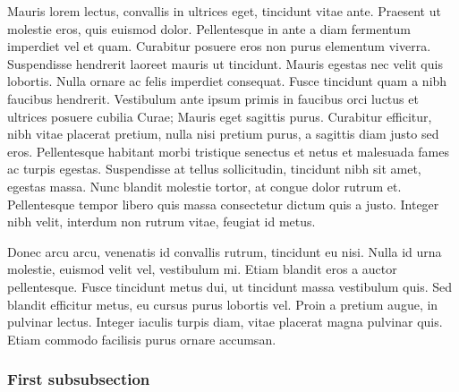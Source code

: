 \documentclass[12pt]{article}
\begin{document}
Mauris lorem lectus, convallis in ultrices eget, tincidunt vitae ante. Praesent ut molestie eros, quis euismod dolor. Pellentesque in ante a diam fermentum imperdiet vel et quam. Curabitur posuere eros non purus elementum viverra. Suspendisse hendrerit laoreet mauris ut tincidunt. Mauris egestas nec velit quis lobortis. Nulla ornare ac felis imperdiet consequat. Fusce tincidunt quam a nibh faucibus hendrerit. Vestibulum ante ipsum primis in faucibus orci luctus et ultrices posuere cubilia Curae; Mauris eget sagittis purus. Curabitur efficitur, nibh vitae placerat pretium, nulla nisi pretium purus, a sagittis diam justo sed eros. Pellentesque habitant morbi tristique senectus et netus et malesuada fames ac turpis egestas. Suspendisse at tellus sollicitudin, tincidunt nibh sit amet, egestas massa. Nunc blandit molestie tortor, at congue dolor rutrum et. Pellentesque tempor libero quis massa consectetur dictum quis a justo. Integer nibh velit, interdum non rutrum vitae, feugiat id metus.

Donec arcu arcu, venenatis id convallis rutrum, tincidunt eu nisi. Nulla id urna molestie, euismod velit vel, vestibulum mi. Etiam blandit eros a auctor pellentesque. Fusce tincidunt metus dui, ut tincidunt massa vestibulum quis. Sed blandit efficitur metus, eu cursus purus lobortis vel. Proin a pretium augue, in pulvinar lectus. Integer iaculis turpis diam, vitae placerat magna pulvinar quis. Etiam commodo facilisis purus ornare accumsan. 


\newpage




\subsubsection{First subsubsection}
\end{document}

